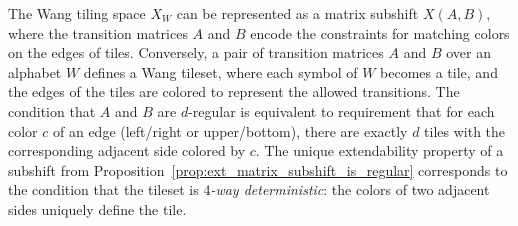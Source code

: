 \documentclass[12pt]{article}
\theoremstyle{definition}
\begin{document}
The Wang tiling space $X_W$ can be represented as a matrix subshift $X(A,B)$, where the transition matrices $A$ and $B$ encode the constraints for matching colors on the edges of tiles. Conversely, a pair of transition matrices $A$ and $B$ over an alphabet $W$ defines a Wang tileset, where each symbol of $W$ becomes a tile, and the edges of the tiles are colored to represent the allowed transitions. The condition that $A$ and $B$ are $d$-regular is equivalent to requirement that for each color $c$ of an edge (left/right or upper/bottom), there are exactly $d$ tiles with the corresponding adjacent side colored by $c$. The unique extendability property of a subshift from Proposition~\ref{prop:ext_matrix_subshift_is_regular} corresponds to the condition that the tileset is \textit{$4$-way deterministic}: the colors of two adjacent sides uniquely define the tile.
\end{document}
